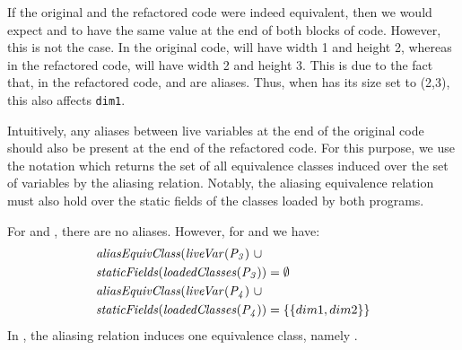 \documentclass[sigconf,review,anonymous]{acmart}
\begin{document}
\begin{example}
If the original and the refactored code were indeed equivalent,
then we would expect  and  to have the same value at the end of both blocks of code. 
However, this is not the case.
In the original code,  will have width 1 and height 2, whereas in the refactored code,
 will have width 2 and height 3. This is due to the fact that,
in the refactored code,  and  are aliases. %
Thus, when  has its size set to (2,3), this also affects \texttt{dim1}.
\end{example}  

Intuitively, any aliases between live variables at the end of the original code should also
be present at the end of the refactored code. For this purpose, we use the notation
 which returns the set of all equivalence classes induced over the
set of variables  by the aliasing relation.  
Notably, the aliasing equivalence relation must also hold over the
static fields of the classes loaded by both programs.


\begin{example}
For  and , there are no aliases. 
%
However, for  and  we have:
\[
\begin{aligned}[t]
  &\mathit{{aliasEquivClass(liveVar(P_3)}}~ \cup\\
  &\mathit{{staticFields(loadedClasses(P_3))}} = \emptyset\\
  &\mathit{{aliasEquivClass(liveVar(P_4)}} ~\cup\\
  &\mathit{{staticFields(loadedClasses(P_4))}} = \{\{dim1, dim2\}\} 
\end{aligned}
\]
In , the aliasing relation induces one equivalence class, namely .

\end{example}
  
\end{document}
